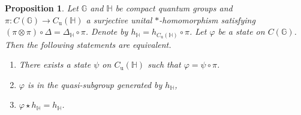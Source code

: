\documentclass[12pt]{amsart}
\newtheorem{proposition}[theorem]{Proposition}
\theoremstyle{remark}
\theoremstyle{remark}
\begin{document}
\begin{proposition}
  Let $\mathbb{G}$ and $\mathbb{H}$ be compact quantum groups and $\pi : C(\mathbb{G}) \to C_{\text{u}}(\mathbb{H})$ a surjective unital $*$-homomorphism satisfying $(\pi \otimes \pi) \circ \Delta = \Delta_{\mathbb{H}} \circ \pi$.  Denote by $h_{\mathbb{H}} = h_{C_{\text{u}}(\mathbb{H})} \circ \pi$. Let $\varphi$ be a state on $C(\mathbb{G})$. Then the following statements are equivalent.
\begin{enumerate}
\item[(i)] There exists a state $\psi$ on $C_{\text{u}}(\mathbb{H})$ such that $\varphi = \psi \circ \pi$.
\item[(ii)] $\varphi$ is in the quasi-subgroup generated by $h_{\mathbb{H}}$,
\item[(iii)] $\varphi \star h_{\mathbb{H}}=h_{\mathbb{H}}$.
\end{enumerate}
\end{proposition}
\end{document}
